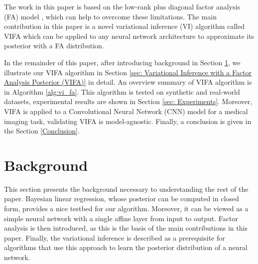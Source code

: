\documentclass[10pt]{article} %
\begin{document}
The work in this paper is based on the low-rank plus diagonal factor analysis (FA) model \citep{barber2007}, which can help to overcome these limitations. The main contribution in this paper is a novel variational inference (VI) algorithm called VIFA which can be applied to any neural network architecture to approximate its posterior with a FA distribution. 

In the remainder of this paper, after introducing background in Section \ref{sec:background}, we illustrate our VIFA algorithm in Section \ref{sec: Variational Inference with a Factor Analysis Posterior (VIFA)} in detail. An overview summary of VIFA algorithm is in Algorithm \ref{alg:vi_fa}. This algorithm is tested on synthetic and real-world datasets, experimental results are shown in Section \ref{sec: Experiments}. Moreover, VIFA is applied to a Convolutional Neural Network (CNN) model for a medical imaging task, validating  VIFA is model-agnostic. Finally, a conclusion is given in the Section \ref{Conclusion}.


\section{Background}
\label{sec:background}
This section presents the background necessary to understanding the rest of the paper. Bayesian linear regression, whose posterior can be computed in closed form, provides a nice testbed for our algorithm. Moreover, it can be viewed as a simple neural network with a single affine layer from input to output. Factor analysis is then introduced, as this is the basis of the main contributions in this paper. Finally, the variational inference is described as a prerequisite for algorithms that use this approach to learn the posterior distribution of a neural network.
\end{document}
